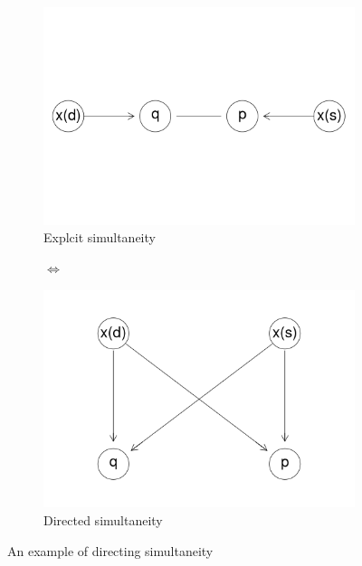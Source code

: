 \documentclass{article}
\begin{document}
\begin{figure}

  \centering
  \begin{subfigure}{0.45\textwidth}
    \centering
    \includegraphics[width=\linewidth]{images/simultaneous.png} 
    \caption{Explcit simultaneity}
    \label{dag7_a}
  \end{subfigure}
  \begin{subfigure}{0.05\textwidth}
    \centering
    $\iff$
  \end{subfigure}
  \begin{subfigure}{0.45\textwidth}
    \includegraphics[width=\linewidth]{images/directed.png}
    \caption{Directed simultaneity}
    \label{dag7_b}
  \end{subfigure}

  \caption{An example of directing simultaneity}
  \label{dag7}
\end{figure}
\end{document}
